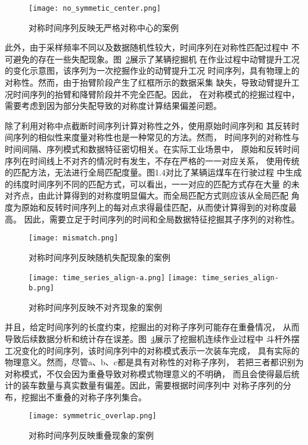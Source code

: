 \begin{figure}[h]
  \centering
  \texttt{[image: no\_symmetic\_center.png]}
  \caption{对称时间序列反映无严格对称中心的案例}
  \label{fig:no_symmetic_center}
\end{figure}

此外，由于采样频率不同以及数据随机性较大，时间序列在对称性匹配过程中
不可避免的存在一些失配现象。图~\ref{fig:mismatch}展示了某辆挖掘机
在作业过程中动臂提升工况的变化示意图，该序列为一次挖掘作业的动臂提升工况
时间序列，具有物理上的对称性。然而，由于抬臂阶段产生了红框所示的数据采集
缺失，导致动臂提升工况时间序列的抬臂和降臂阶段并不完全匹配。因此，
在对称模式的挖掘过程中，需要考虑到因为部分失配导致的对称度计算结果偏差问题。

除了利用对称中点截断时间序列计算对称性之外，使用原始时间序列和
其反转时间序列的相似性来度量对称性也是一种常见的方法。然而，
时间序列的对称性与时间间隔、序列模式和数据特征密切相关。在实际工业场景中，
原始和反转时间序列在时间线上不对齐的情况时有发生，不存在严格的一一对应关系，
使用传统的匹配方法，无法进行全局匹配度量。图1.4对比了某辆运煤车在行驶过程
中生成的纬度时间序列不同的匹配方式，可以看出，一一对应的匹配方式存在大量
的未对齐点，由此计算得到的对称度明显偏大。而全局匹配方式则应该从全局匹配
角度为原始和反转时间序列上的每对点求得最佳匹配，从而使计算得到的对称度最高。
因此，需要立足于时间序列的时间和全局数据特征挖掘其子序列的对称性。
\begin{figure}
  \centering
  \texttt{[image: mismatch.png]}
  \caption{对称时间序列反映随机失配现象的案例}
  \label{fig:mismatch}
\end{figure}
\begin{figure}
  \centering
    {\texttt{[image: time\_series\_align-a.png]}}
    {\texttt{[image: time\_series\_align-b.png]}}
  \caption{对称时间序列反映不对齐现象的案例}
  \label{fig:time_series_align}
\end{figure}

并且，给定时间序列的长度约束，挖掘出的对称子序列可能存在重叠情况，
从而导致后续数据分析和统计存在误差。图~\ref{fig:overlap}展示了挖掘机连续作业过程中
斗杆外摆工况变化的时间序列，该时间序列中的对称模式表示一次装车完成，
具有实际的物理意义。然而，尽管a、b、c都是具有对称性的对称子序列，
若把三者都识别为对称模式，不仅会因为重叠导致对称模式物理意义的不明确，
而且会使得最后统计的装车数量与真实数量有偏差。因此，需要根据时间序列中
对称子序列的分布，挖掘出不重叠的对称子序列集合。
\begin{figure}
  \centering
  \texttt{[image: symmetric\_overlap.png]}
  \caption{对称时间序列反映重叠现象的案例}
  \label{fig:overlap}
\end{figure}

